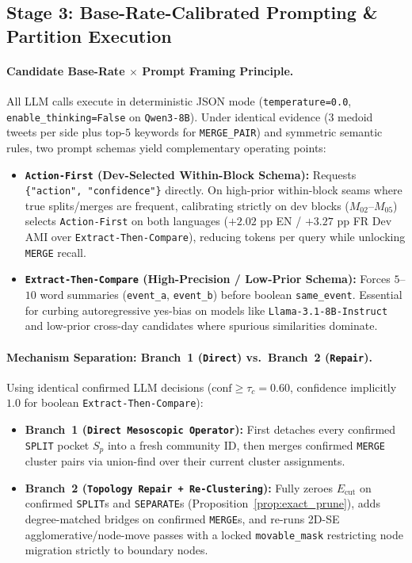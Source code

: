 \subsection{Stage 3: Base-Rate-Calibrated Prompting \& Partition Execution}
\paragraph{Candidate Base-Rate $\times$ Prompt Framing Principle.}
All LLM calls execute in deterministic JSON mode (\texttt{temperature=0.0}, \texttt{enable\_thinking=False} on \texttt{Qwen3-8B}). Under identical evidence ($3$ medoid tweets per side plus top-$5$ keywords for \texttt{MERGE\_PAIR}) and symmetric semantic rules, two prompt schemas yield complementary operating points:
\begin{itemize}
    \item \textbf{\texttt{Action-First} (Dev-Selected Within-Block Schema):} Requests \texttt{\{"action", "confidence"\}} directly. On high-prior within-block seams where true splits/merges are frequent, calibrating strictly on dev blocks ($M_{02}$--$M_{05}$) selects \texttt{Action-First} on both languages ($+2.02\text{ pp}$ EN / $+3.27\text{ pp}$ FR Dev AMI over \texttt{Extract-Then-Compare}), reducing tokens per query while unlocking \texttt{MERGE} recall.
    \item \textbf{\texttt{Extract-Then-Compare} (High-Precision / Low-Prior Schema):} Forces $5$--$10$ word summaries (\texttt{event\_a}, \texttt{event\_b}) before boolean \texttt{same\_event}. Essential for curbing autoregressive yes-bias on models like \texttt{Llama-3.1-8B-Instruct} and low-prior cross-day candidates where spurious similarities dominate.
\end{itemize}

\paragraph{Mechanism Separation: Branch~1 (\texttt{Direct}) vs.\ Branch~2 (\texttt{Repair}).}
Using identical confirmed LLM decisions ($\text{conf} \ge \tau_c = 0.60$, confidence implicitly $1.0$ for boolean \texttt{Extract-Then-Compare}):
\begin{itemize}
    \item \textbf{Branch~1 (\texttt{Direct Mesoscopic Operator}):} First detaches every confirmed \texttt{SPLIT} pocket $S_p$ into a fresh community ID, then merges confirmed \texttt{MERGE} cluster pairs via union-find over their current cluster assignments.
    \item \textbf{Branch~2 (\texttt{Topology Repair + Re-Clustering}):} Fully zeroes $E_{\text{cut}}$ on confirmed \texttt{SPLIT}s and \texttt{SEPARATE}s (Proposition~\ref{prop:exact_prune}), adds degree-matched bridges on confirmed \texttt{MERGE}s, and re-runs 2D-SE agglomerative/node-move passes with a locked \texttt{movable\_mask} restricting node migration strictly to boundary nodes.
\end{itemize}

